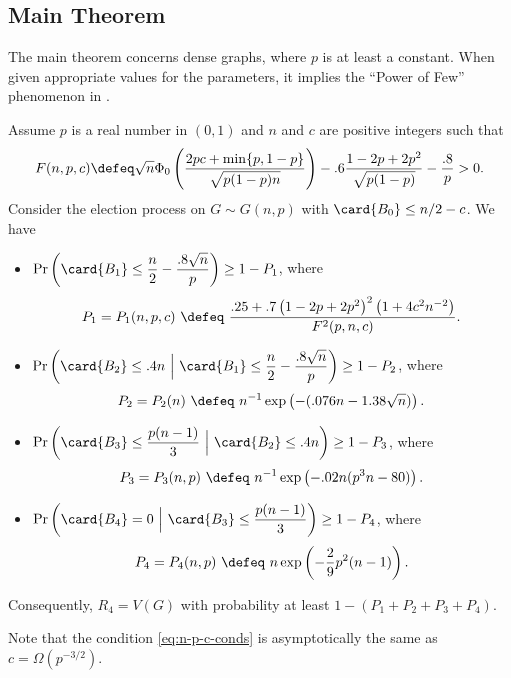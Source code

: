 \documentclass{toc}
\begin{document}
			
			\subsection{Main Theorem} \label{subsec:main-theorem}
			
			The main theorem concerns dense graphs, where $p$ is at least a constant.  When given appropriate values for the parameters, it implies the ``Power of Few'' phenomenon in .
			
			\begin{theorem} \label{thm:const-advantage}
				Assume $p$ is a real number in $(0, 1)$ and $n$ and $c$ are positive integers such that 
				\begin{equation} \label{eq:n-p-c-conds}
					F(n, p, c) \defeq \sqrt{n} \Phi_0 \left( \frac{2pc %
						+ \min\{p, 1 - p\}  %
					}{\sqrt{p(1 - p)n}} \right) - .6\frac{1 - 2p + 2p^2}{\sqrt{p(1 - p)}} - \frac{.8}{p} > 0.
				\end{equation}
				Consider the election process on $G\sim G(n, p)$ with $\card{B_0}\le n/2 - c$.
				We have
				\begin{itemize}
					\item $\displaystyle \Pr\left(\card{B_1}\le \frac{n}{2} - \frac{.8\sqrt{n}}{p}\right) \ge 1 - P_1$, where
					\[
					P_1 = P_1(n, p, c) \ \defeq \ \frac{.25 + .7\left(1 - 2p + 2p^2\right)^2\left(1 + 4c^2n^{-2}\right)}{F^2(p, n, c)}.
					\]
					\item $\displaystyle \Pr\left(\card{B_2} \le .4n ~\Big|~ \card{B_1}\le \frac{n}{2} - \frac{.8\sqrt{n}}{p}\right) \ge 1 - P_2$, where
					\[
					P_2 = P_2(n) \ \defeq \ n^{-1}\exp\left( -(.076n - 1.38\sqrt{n}) \right).
					\]
					\item $\displaystyle \Pr\left(\card{B_3}\le \frac{p(n - 1)}{3} ~\Big|~ \card{B_2} \le .4n\right) \ge 1 - P_3$, where
					\[
					P_3 = P_3(n, p) \ \defeq \ n^{-1}\exp\left( -.02n(p^3n - 80) \right).
					\]
					\item $\displaystyle \Pr\left(\card{B_4} = 0 ~\Big|~ \card{B_3}\le \frac{p(n - 1)}{3}\right) \ge 1 - P_4$, where
					\[
					P_4 = P_4(n, p) \ \defeq \ n\exp\left(-\frac{2}{9}p^2(n-1)\right).
					\]
				\end{itemize}
				Consequently, $R_4 = V(G)$ with probability at least $1 - (P_1 + P_2 + P_3 + P_4)$.
			\end{theorem}
			
			Note that the condition \eqref{eq:n-p-c-conds} is asymptotically the same as $c = \Omega(p^{-3/2})$.
			
\end{document}
